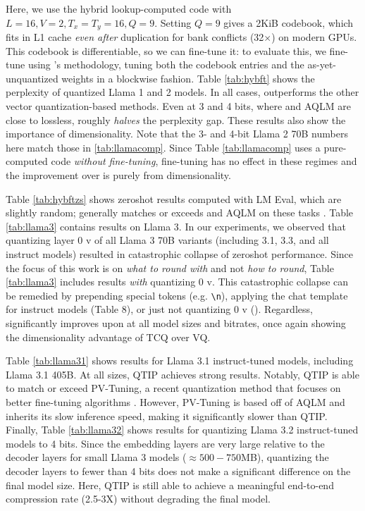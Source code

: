 Here, we use the hybrid lookup-computed code with $L=16, V=2, T_x = T_y=16, Q=9$.
Setting $Q=9$ gives a 2KiB codebook, which fits in L1 cache \textit{even after} duplication for bank conflicts (32$\times$) on modern GPUs.
This codebook is differentiable, so we can fine-tune it: to evaluate this, we fine-tune using \qs's methodology, tuning both the codebook entries and the as-yet-unquantized weights in a blockwise fashion.
Table \ref{tab:hybft} shows the perplexity of quantized Llama 1 and 2 models.
In all cases, \qts outperforms the other vector quantization-based methods.
Even at 3 and 4 bits, where \qss and AQLM are close to lossless, \qts roughly \textit{halves} the perplexity gap. 
These results also show the importance of dimensionality.
Note that the 3- and 4-bit Llama 2 70B numbers here match those in \ref{tab:llamacomp}.
Since Table \ref{tab:llamacomp} uses a pure-computed code \textit{without fine-tuning}, fine-tuning has no effect in these regimes and the improvement over \qss is purely from dimensionality.

Table \ref{tab:hybftzs} shows zeroshot results computed with LM Eval, which are slightly random; \qts generally matches or exceeds \qss and AQLM on these tasks \cite{lmeval}.
Table \ref{tab:llama3} contains results on Llama 3.
In our experiments, we observed that quantizing layer 0 v of all Llama 3 70B variants (including 3.1, 3.3, and all instruct models) resulted in catastrophic collapse of zeroshot performance. 
Since the focus of this work is on \textit{what to round with} and not \textit{how to round}, Table \ref{tab:llama3} includes results \textit{with} quantizing 0 v. 
This catastrophic collapse can be remedied by prepending special tokens (e.g. \texttt{\textbackslash n}), applying the chat template for instruct models (Table 8), or just not quantizing 0 v (\cite{yaqa}).
Regardless, \qts significantly improves upon \qss at all model sizes and bitrates, once again showing the dimensionality advantage of TCQ over VQ.

Table \ref{tab:llama31} shows results for Llama 3.1 instruct-tuned models, including Llama 3.1 405B.
At all sizes, QTIP achieves strong results.
Notably, QTIP is able to match or exceed PV-Tuning, a recent quantization method that focuses on better fine-tuning algorithms \cite{pvtuning}.
However, PV-Tuning is based off of AQLM and inherits its slow inference speed, making it significantly slower than QTIP.
Finally, Table \ref{tab:llama32} shows results for quantizing Llama 3.2 instruct-tuned models to 4 bits.
Since the embedding layers are very large relative to the decoder layers for small Llama 3 models ($\approx 500-750$MB), quantizing the decoder layers to fewer than 4 bits does not make a significant difference on the final model size. 
Here, QTIP is still able to achieve a meaningful end-to-end compression rate (2.5-3X) without degrading the final model. 

